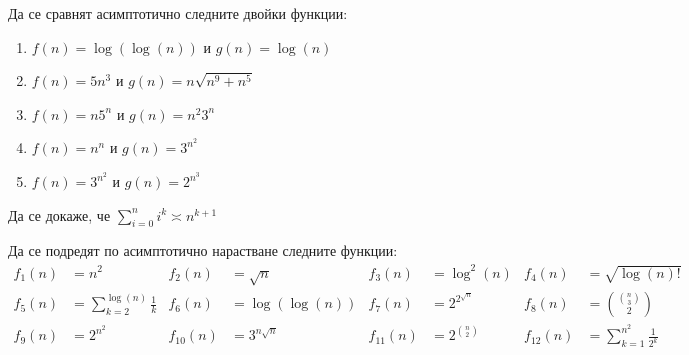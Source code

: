 \begin{problem}
Да се сравнят асимптотично следните двойки функции:
\begin{enumerate}
  \item $f(n) = \log(\log(n))$ и $g(n) = \log(n)$
  \item $f(n) = 5n^3$ и $g(n) = n \sqrt{n^9 + n^5}$
  \item $f(n) = n 5^n$ и $g(n) = n^ 2 3^n$
  \item $f(n) = n^n$ и $g(n) = 3^{n^2}$
  \item $f(n) = 3^{n^2}$ и $g(n) = 2^{n^3}$
\end{enumerate}
\end{problem}

\begin{problem}
Да се докаже, че $\sum\limits_{i = 0}^n i^k \asymp n^{k+1}$
\end{problem}

\begin{problem}
Да се подредят по асимптотично нарастване следните функции:
\begin{align*}
  f_1(n) & = n^2                                       & f_2(n)    & = \sqrt{n}       & f_3(n)    & = \log^2(n)        & f_4(n)    & = \sqrt{\log(n)!}                         \\
  f_5(n) & = \sum\limits_{k = 2}^{\log(n)} \frac{1}{k} & f_6(n)    & = \log(\log(n))  & f_7(n)    & = 2^{2^{\sqrt{n}}} & f_8(n)    & = \binom{\binom{n}{3}}{2}                 \\
  f_9(n) & =2^{n^2}                                    & f_{10}(n) & = 3^{n \sqrt{n}} & f_{11}(n) & =2^{\binom{n}{2}}  & f_{12}(n) & = \sum\limits_{k = 1}^{n^2} \frac{1}{2^k}
\end{align*}
\end{problem}
